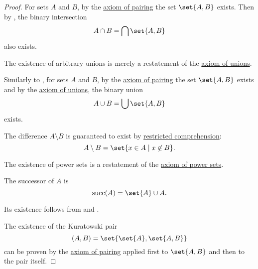 \begin{proof}
   For sets \( A \) and \( B \), by the \hyperref[def:zfc/pairing]{axiom of pairing} the set \( \set{ A, B } \) exists. Then by , the binary intersection
  \begin{equation*}
    A \cap B = \bigcap \set{ A, B }
  \end{equation*}
  also exists.

   The existence of arbitrary unions is merely a restatement of the \hyperref[def:zfc/union]{axiom of unions}.

   Similarly to , for sets \( A \) and \( B \), by the \hyperref[def:zfc/pairing]{axiom of pairing} the set \( \set{ A, B } \) exists and by the \hyperref[def:zfc/union]{axiom of unions}, the binary union
  \begin{equation*}
    A \cup B = \bigcup \set{ A, B }
  \end{equation*}
  exists.

   The difference \( A \setminus B \) is guaranteed to exist by \hyperref[def:zfc/specification]{restricted comprehension}:
  \begin{equation*}
    A \setminus B = \set{ x \in A \given x \not\in B }.
  \end{equation*}

   The existence of power sets is a restatement of the \hyperref[def:zfc/power_set]{axiom of power sets}.

   The successor of \( A \) is
  \begin{equation*}
    \op{succ}(A) = \set{ A } \cup A.
  \end{equation*}

  Its existence follows from  and .

   The existence of the Kuratowski pair
  \begin{equation*}
    (A, B) = \set{ \set{ A }, \set{ A, B } }
  \end{equation*}
  can be proven by the \hyperref[def:zfc/pairing]{axiom of pairing} applied first to \( \set{ A, B } \) and then to the pair itself.


\end{proof}

